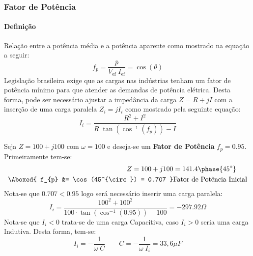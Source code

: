 \documentclass{article}
\begin{document}
            \subsubsection{Fator de Potência}
                \paragraph{Definição}Relação entre a potência média e a potência aparente como mostrado na equação a seguir:
                    \begin{equation}
                        \boxed{
                            f_{p} = \frac{\bar{p}}{V_{\text{ef}}\;I_{\text{ef}}} = \cos(\theta)
                        }
                    \end{equation}
                Legislação brasileira exige que as cargas nas indústrias tenham um fator de potência mínimo para que atender as demandas de potência elétrica. Desta forma, pode ser necessário ajustar a impedância da carga $Z = R + jI$ com a inserção de uma carga paralela $Z_{i} = j I_{i}$ como mostrado pela seguinte equação:
                    \begin{equation}
                        \boxed{
                            I_{i} = \frac{R^2 + I^2}{R\;\tan(\cos^{-1}(f_{p})) - I}
                        }
                    \end{equation}
                    \begin{example}
                        Seja $Z = 100 + j100$ com $\omega = 100$ e deseja-se um \textbf{Fator de Potência} $f_{p} = 0.95$. Primeiramente tem-se:
                            \begin{align*}
                                Z = 100 + j100 &= 141.4\phase{45^{\circ}}\\
                                \Aboxed{
                                    f_{p} &= \cos(45^{\circ}) = 0.707
                                } & \text{Fator de Potência Inicial}
                            \end{align*}
                        Nota-se que $0.707 < 0.95$ logo será necessário inserir uma carga paralela:
                            \begin{equation*}
                                I_{i} = \frac{100^2 + 100^2}{100\cdot\tan(\cos^{-1}(0.95)) - 100} = -297.92 \Omega
                            \end{equation*}
                        Nota-se que $I_{i} < 0$ trata-se de uma carga Capacitiva, caso $I_{i} > 0$ seria uma carga Indutiva. Desta forma, tem-se: 
                            \begin{equation*}
                                I_{i} = -\frac{1}{\omega\;C}
                                \qquad
                                \boxed{
                                    C = - \frac{1}{\omega\;I_{i}} = 33,6 \mu F
                                }
                            \end{equation*}
                    \end{example}
\end{document}
